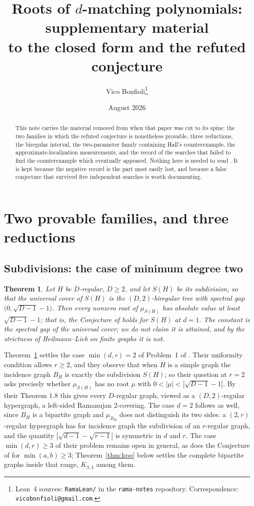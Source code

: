 \documentclass[11pt]{article}
\title{Roots of $d$-matching polynomials: supplementary material\\
to the closed form and the refuted conjecture}
\author{Vico Bonfioli\thanks{Lean~4 sources: \texttt{RamaLean/} in the \texttt{rama-notes} repository. Correspondence: \texttt{vicobonfioli@gmail.com}.}}
\date{August 2026}
\newtheorem{theorem}{Theorem}
\theoremstyle{remark}
\begin{document}
\maketitle

\begin{abstract}
This note carries the material removed from \cite{PartI} when that paper was cut to its
spine: the two families in which the refuted conjecture is nonetheless provable, three
reductions, the biregular interval, the two-parameter family containing Hall’s
counterexample, the approximate-localization measurements, and the record of the searches
that failed to find the counterexample which eventually appeared. Nothing here is needed to
read \cite{PartI}. It is kept because the negative record is the part most easily lost, and
because a false conjecture that survived five independent searches is worth documenting.
\end{abstract}

\section{Two provable families, and three reductions}

\subsection{Subdivisions: the case of minimum degree two}

\begin{theorem}\label{thm:subdiv}
Let $H$ be $D$-regular, $D\ge2$, and let $S(H)$ be its subdivision, so that the
universal cover of $S(H)$ is the $(D,2)$-biregular tree with spectral gap
$\bigl(0,\sqrt{D-1}-1\bigr)$. Then every nonzero root of $\mu_{S(H)}$ has
absolute value at least $\sqrt{D-1}-1$; that is,
the Conjecture of \cite{PartI} holds for $S(H)$ at $d=1$. The constant is the spectral
gap of the universal cover; we do not claim it is attained, and by the strictness
of Heilmann--Lieb on finite graphs it is not.
\end{theorem}

Theorem~\ref{thm:subdiv} settles the case $\min(d,r)=2$ of Problem~1 of
\cite{SFM}.
Their uniformity condition allows $r\ge2$, and they observe that when $H$ is a
simple graph the incidence graph $B_H$ is exactly the subdivision $S(H)$; so
their question at $r=2$ asks precisely whether $\mu_{S(H)}$ has no root $\mu$
with $0<|\mu|<|\sqrt{D-1}-1|$. By their Theorem 1.8 this gives every
$D$-regular graph, viewed as a $(D,2)$-regular hypergraph, a left-sided
Ramanujan $2$-covering. The case $d=2$ follows as well, since $B_H$ is a
bipartite graph and $\mu_{B_H}$ does not distinguish its two sides: a
$(2,r)$-regular hypergraph has for incidence graph the subdivision of an
$r$-regular graph, and the quantity $|\sqrt{d-1}-\sqrt{r-1}|$ is symmetric in
$d$ and $r$. The case $\min(d,r)\ge3$ of their problem remains open in general, as does
the Conjecture of \cite{PartI} for $\min(a,b)\ge3$; Theorem~\ref{thm:kpq} below settles the
complete bipartite graphs inside that range, $K_{3,4}$ among them.
\end{document}
